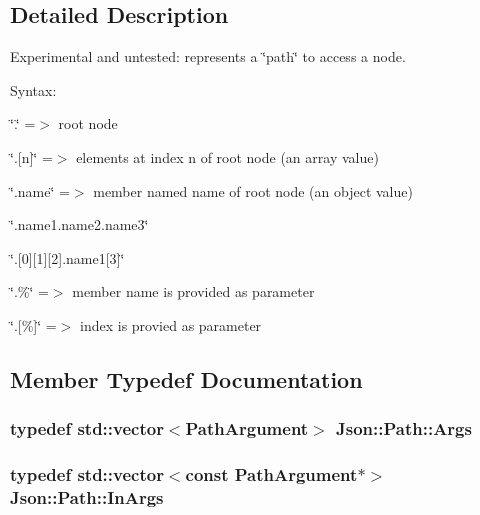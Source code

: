 \subsection{Detailed Description}
Experimental and untested\+: represents a \char`\"{}path\char`\"{} to access a node. 

Syntax\+:
\begin{DoxyItemize}
\item \char`\"{}.\char`\"{} =$>$ root node
\item \char`\"{}.\mbox{[}n\mbox{]}\char`\"{} =$>$ elements at index \textquotesingle{}n\textquotesingle{} of root node (an array value)
\item \char`\"{}.\+name\char`\"{} =$>$ member named \textquotesingle{}name\textquotesingle{} of root node (an object value)
\item \char`\"{}.\+name1.\+name2.\+name3\char`\"{}
\item \char`\"{}.\mbox{[}0\mbox{]}\mbox{[}1\mbox{]}\mbox{[}2\mbox{]}.\+name1\mbox{[}3\mbox{]}\char`\"{}
\item \char`\"{}.\%\char`\"{} =$>$ member name is provided as parameter
\item \char`\"{}.\mbox{[}\%\mbox{]}\char`\"{} =$>$ index is provied as parameter 
\end{DoxyItemize}

\subsection{Member Typedef Documentation}
\subsubsection[{\texorpdfstring{Args}{Args}}]{\setlength{\rightskip}{0pt plus 5cm}typedef std\+::vector$<${\bf Path\+Argument}$>$ {\bf Json\+::\+Path\+::\+Args}\hspace{0.3cm}{\ttfamily [private]}}\hypertarget{classJson_1_1Path_a27d96232d034d7a78286468676f9cb3e}{}\label{classJson_1_1Path_a27d96232d034d7a78286468676f9cb3e}
\subsubsection[{\texorpdfstring{In\+Args}{InArgs}}]{\setlength{\rightskip}{0pt plus 5cm}typedef std\+::vector$<$const {\bf Path\+Argument}$\ast$$>$ {\bf Json\+::\+Path\+::\+In\+Args}\hspace{0.3cm}{\ttfamily [private]}}\hypertarget{classJson_1_1Path_ab29d7b2fc896c7d3c5ed4609af3a3f23}{}\label{classJson_1_1Path_ab29d7b2fc896c7d3c5ed4609af3a3f23}



